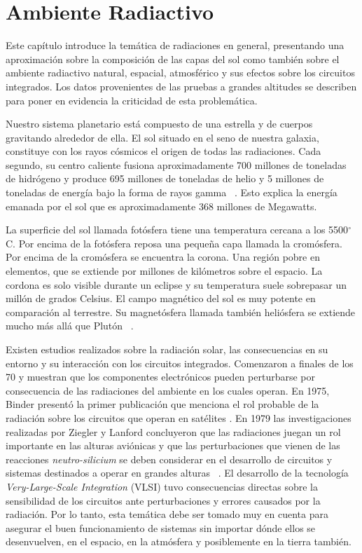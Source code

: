 \documentclass[a4paper,openright,12pt]{report}
\newcommand{\grad}{$^{\circ}$}
\begin{document}
\chapter{Ambiente Radiactivo}


Este capítulo introduce la temática de radiaciones en general, presentando una aproximación sobre la composición de las capas del sol como también sobre el ambiente radiactivo natural, espacial, atmosférico y sus efectos sobre los circuitos integrados. Los datos provenientes de las pruebas a grandes 
altitudes se describen para poner en evidencia la criticidad de esta problemática.


Nuestro sistema planetario está compuesto de una estrella y de cuerpos gravitando alrededor de ella. El sol situado en el seno de nuestra galaxia, constituye con los rayos cósmicos el origen de todas las radiaciones. Cada segundo, su centro caliente fusiona aproximadamente 700 millones de toneladas de hidrógeno y produce 695 millones de toneladas de helio y 5 millones de toneladas de energía bajo la forma de rayos gamma ~\cite{eddy2009}. Esto explica la energía emanada por el sol que es aproximadamente 368 millones de Megawatts.
   

La superficie del sol llamada fotósfera tiene una temperatura cercana a los 5500\grad C. Por encima de la fotósfera reposa una pequeña capa llamada la cromósfera. Por encima de la cromósfera se encuentra la corona. Una región pobre en elementos, que se extiende por millones de kilómetros sobre el espacio. La cordona es solo   visible durante un eclipse  y su temperatura suele sobrepasar un millón de grados Celsius. El campo magnético del sol es muy potente en comparación al terrestre. Su magnetósfera llamada también heliósfera se extiende mucho más allá que Plutón ~\cite{eddy2009}.

Existen estudios  realizados sobre la radiación solar, las consecuencias en su entorno y su interacción con los circuitos integrados. Comenzaron a finales de los 70 y muestran que los componentes electrónicos pueden perturbarse por consecuencia de las radiaciones del ambiente en los cuales operan. En 1975, Binder presentó la primer publicación que menciona el rol probable de la radiación sobre los circuitos que operan  en satélites \cite{4328188}. En 1979 las investigaciones realizadas  por Ziegler y Lanford concluyeron   que las radiaciones juegan un rol  importante en las alturas aviónicas y que las perturbaciones que vienen de las reacciones \textit{neutro-silicium} se deben considerar en el desarrollo de circuitos y sistemas destinados a operar en grandes alturas ~\cite{ziegler1996}. 
El desarrollo de la tecnología  \textit{Very-Large-Scale Integration} (VLSI) tuvo consecuencias directas sobre la sensibilidad de los circuitos ante perturbaciones y errores causados por la radiación. Por lo tanto, esta temática  debe ser tomado muy en cuenta para asegurar el buen funcionamiento de sistemas sin importar dónde ellos se desenvuelven, en el espacio, en la atmósfera y posiblemente en la tierra también.
\end{document}
